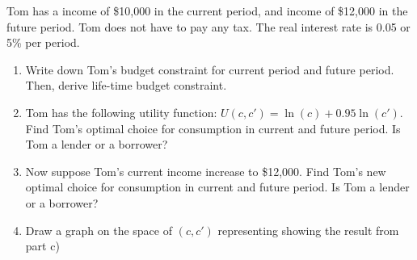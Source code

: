 \documentclass[addpoints,ngerman,12pt,answers]{exam}
\begin{document}
	\vspace*{3em}
	
	
	\vspace*{3em}
	\begin{questions}
		
		
		\question Tom has a income of \$10,000 in the current period, and income of \$12,000 in the future period. Tom does not have to pay any tax. The real interest rate is 0.05 or 5\% per period.
		
		\begin{enumerate}[label=(\alph*)]
			\item Write down Tom's budget constraint for current period and future period. Then, derive life-time budget constraint.
			\item Tom has the following utility function: $U(c,c') = \ln(c) + 0.95\ln(c')$. Find Tom's optimal choice for consumption in current and future period. Is Tom a lender or a borrower?
			\item Now suppose Tom's current income increase to \$12,000. Find Tom's new optimal choice for consumption in current and future period. Is Tom a lender or a borrower?
			\item Draw a graph on the space of $(c,c')$ representing showing the result from part c)
		\end{enumerate}

\end{questions}
\end{document}
